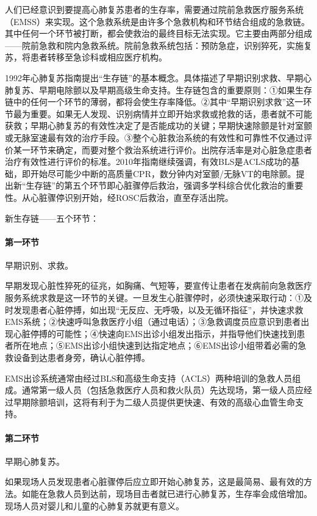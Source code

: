 人们已经意识到要提高心肺复苏患者的生存率，需要通过院前急救医疗服务系统（EMSS）来实现。这个急救系统是由许多个急救机构和环节结合组成的急救链。其中任何一个环节被打断，都会使救治的最终目标无法实现。它主要由两部分组成------院前急救和院内急救系统。院前急救系统包括：预防急症，识别猝死，实施复苏，将患者转移至急诊科或相应医疗机构。

1992年心肺复苏指南提出“生存链”的基本概念。具体描述了早期识别求救、早期心肺复苏、早期电除颤以及早期高级生命支持。生存链包含的重要原则：①如果生存链中的任何一个环节的薄弱，都将会使生存率降低。②其中“早期识别求救”这一环节最为重要。如果无人发现、识别病情并立即开始求救或抢救的话，患者就不可能获救；早期心肺复苏的有效性决定了是否能成功的关键；早期快速除颤是针对室颤或无脉室速最有效的治疗手段。③整个心脏救治系统的有效性和可靠性不仅通过评价某一环节来确定，而要对整个救治系统进行评价。出院存活率是对心脏急症患者治疗有效性进行评价的标准。2010年指南继续强调，有效BLS是ACLS成功的基础，即开始尽可能少中断的高质量CPR，数分钟内对室颤/无脉VT的电除颤。提出新“生存链”的第五个环节即心脏骤停后救治，强调多学科综合优化救治的重要性。从心脏骤停识别开始，经ROSC后救治，直至存活出院。

新生存链------五个环节：

\paragraph{第一环节}

早期识别、求救。

早期发现心脏性猝死的征兆，如胸痛、气短等，要宣传让患者在发病前向急救医疗服务系统求救是这一环节的关键。一旦发生心脏骤停时，必须快速采取行动：①及时发现患者心脏停搏，如出现“无反应、无呼吸，以及无循环指征”，并快速求救EMS系统；②快速呼叫急救医疗小组（通过电话）；③急救调度员应意识到患者出现心脏停搏的可能性；④快速向EMS出诊小组发出指示，并指导他们快速找到患者所在地点；⑤EMS出诊小组快速到达指定地点；⑥EMS出诊小组带着必需的急救设备到达患者身旁，确认心脏停搏。

EMS出诊系统通常由经过BLS和高级生命支持（ACLS）两种培训的急救人员组成。通常第一级人员（包括急救医疗人员和救火队员）先达现场，第一级人员应经过早期除颤培训，这将有利于为二级人员提供更快速、有效的高级心血管生命支持。

\paragraph{第二环节}

早期心肺复苏。

如果现场人员发现患者心脏骤停后应立即开始心肺复苏，这是最简易、最有效的方法。如能在急救人员到达前，现场目击者就已进行心肺复苏，生存率会成倍增加。现场人员对婴儿和儿童的心肺复苏就更有意义。

